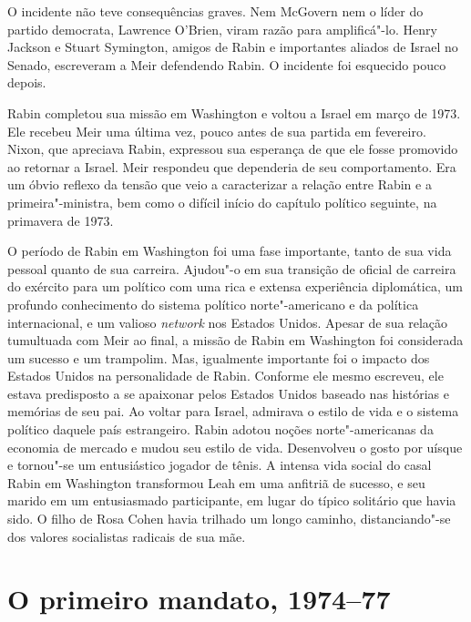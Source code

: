 O incidente não teve consequências graves. Nem McGovern nem o líder do
partido democrata, Lawrence O'Brien, viram razão para amplificá"-lo.
Henry Jackson e Stuart Symington, amigos de Rabin e importantes aliados
de Israel no Senado, escreveram a Meir defendendo Rabin. O incidente foi
esquecido pouco depois.

Rabin completou sua missão em Washington e voltou a Israel em março de
1973. Ele recebeu Meir uma última vez, pouco antes de sua partida em
fevereiro. Nixon, que apreciava Rabin, expressou sua esperança de que
ele fosse promovido ao retornar a Israel. Meir respondeu que dependeria
de seu comportamento. Era um óbvio reflexo da tensão que veio a
caracterizar a relação entre Rabin e a primeira"-ministra, bem como o difícil
início do capítulo político seguinte, na primavera de 1973.

O período de Rabin em Washington foi uma fase importante, tanto de sua
vida pessoal quanto de sua carreira. Ajudou"-o em sua transição de
oficial de carreira do exército para um político com uma rica e extensa
experiência diplomática, um profundo conhecimento do sistema político
norte"-americano e da política internacional, e um valioso \emph{network}
nos Estados Unidos. Apesar de sua relação tumultuada com Meir ao final,
a missão de Rabin em Washington foi considerada um sucesso e um
trampolim. Mas, igualmente importante foi o impacto dos Estados Unidos
na personalidade de Rabin. Conforme ele mesmo escreveu, ele estava
predisposto a se apaixonar pelos Estados Unidos baseado nas histórias e
memórias de seu pai. Ao voltar para Israel, admirava o estilo de vida e o
sistema político daquele país estrangeiro. Rabin adotou noções norte"-americanas da
economia de mercado e mudou seu estilo de vida. Desenvolveu o gosto por
uísque e tornou"-se um entusiástico jogador de tênis. A intensa vida
social do casal Rabin em Washington transformou Leah em uma anfitriã de
sucesso, e seu marido em um entusiasmado participante, em lugar do típico
solitário que havia sido. O filho de Rosa Cohen havia trilhado um longo
caminho, distanciando"-se dos valores socialistas radicais de sua mãe.

\chapter[O primeiro mandato, 1974--77]{O primeiro mandato, 1974--77}

